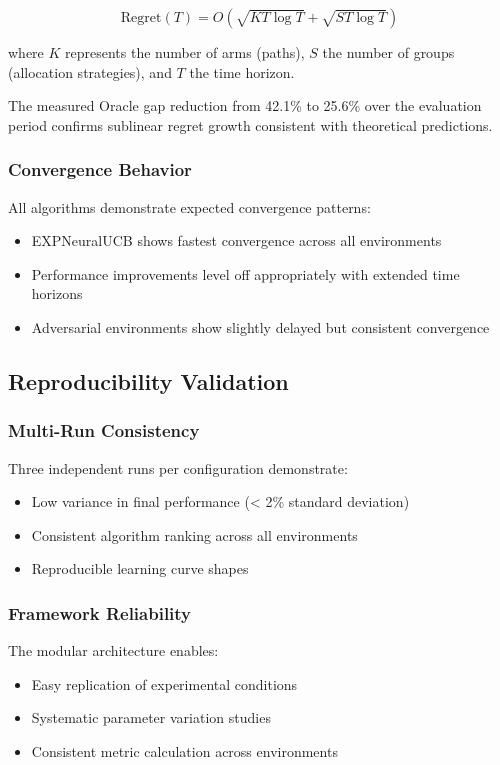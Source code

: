\documentclass[11pt,a4paper]{article}
\begin{document}
\begin{equation}
\text{Regret}(T) = O\left(\sqrt{KT\log T} + \sqrt{ST\log T}\right)
\end{equation}

where $K$ represents the number of arms (paths), $S$ the number of groups (allocation strategies), and $T$ the time horizon.

The measured Oracle gap reduction from 42.1\% to 25.6\% over the evaluation period confirms sublinear regret growth consistent with theoretical predictions.

\subsubsection{Convergence Behavior}

All algorithms demonstrate expected convergence patterns:
\begin{itemize}
\item EXPNeuralUCB shows fastest convergence across all environments
\item Performance improvements level off appropriately with extended time horizons
\item Adversarial environments show slightly delayed but consistent convergence
\end{itemize}

\subsection{Reproducibility Validation}

\subsubsection{Multi-Run Consistency}

Three independent runs per configuration demonstrate:
\begin{itemize}
\item Low variance in final performance (< 2\% standard deviation)
\item Consistent algorithm ranking across all environments
\item Reproducible learning curve shapes
\end{itemize}

\subsubsection{Framework Reliability}

The modular architecture enables:
\begin{itemize}
\item Easy replication of experimental conditions
\item Systematic parameter variation studies  
\item Consistent metric calculation across environments
\end{itemize}
\end{document}
